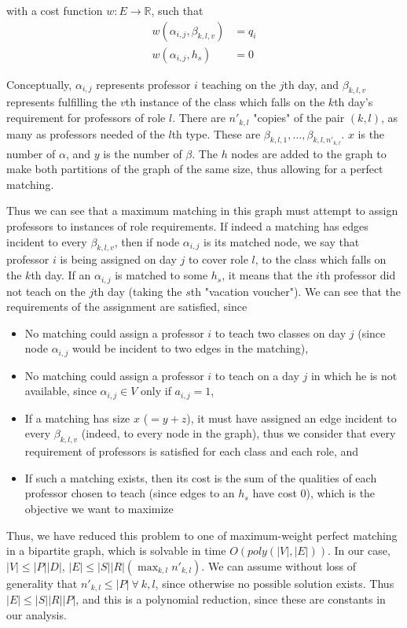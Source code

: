 with a cost function $w: E \to \mathbb{R}$, such that
\begin{align*}
w(\alpha_{i, j}, \beta_{k, l, v}) &= q_i\\
w(\alpha_{i, j}, h_s) &= 0
\end{align*}

Conceptually, $\alpha_{i, j}$ represents professor $i$ teaching on the $j$th day, and $\beta_{k, l, v}$ represents fulfilling the $v$th instance of the class which falls on the $k$th day's requirement for professors of role $l$. There are $n'_{k, l}$ "copies" of the pair $(k, l)$, as many as professors needed of the $l$th type. These are $\beta_{k, l, 1}, \dots, \beta_{k, l, n'_{k, l}}$. $x$ is the number of $\alpha$, and $y$ is the number of $\beta$. The $h$ nodes are added to the graph to make both partitions of the graph of the same size, thus allowing for a perfect matching.

Thus we can see that a maximum matching in this graph must attempt to assign professors to instances of role requirements. If indeed a matching has edges incident to every $\beta_{k, l, v}$, then if node $\alpha_{i, j}$ is its matched node, we say that professor $i$ is being assigned on day $j$ to cover role $l$, to the class which falls on the $k$th day. If an $\alpha_{i, j}$ is matched to some $h_s$, it means that the $i$th professor did not teach on the $j$th day (taking the $s$th "vacation voucher"). We can see that the requirements of the assignment are satisfied, since

\begin{itemize}
\item No matching could assign a professor $i$ to teach two classes on day $j$ (since node $\alpha_{i, j}$ would be incident to two edges in the matching),
\item No matching could assign a professor $i$ to teach on a day $j$ in which he is not available, since $\alpha_{i, j} \in V$ only if $a_{i, j} = 1$,
\item If a matching has size $x$ ($= y + z$), it must have assigned an edge incident to every $\beta_{k, l, v}$ (indeed, to every node in the graph), thus we consider that every requirement of professors is satisfied for each class and each role, and
\item If such a matching exists, then its cost is the sum of the qualities of each professor chosen to teach (since edges to an $h_s$ have cost 0), which is the objective we want to maximize
\end{itemize}

Thus, we have reduced this problem to one of maximum-weight perfect matching in a bipartite graph, which is solvable in time $O(poly(|V|, |E|))$. In our case, $|V| \le |P||D|$, $|E| \le |S||R|(\max_{k, l} n'_{k, l})$. We can assume without loss of generality that $n'_{k, l} \le |P|\ \forall\ k, l$, since otherwise no possible solution exists. Thus $|E| \le |S||R||P|$, and this is a polynomial reduction, since these are constants in our analysis.

